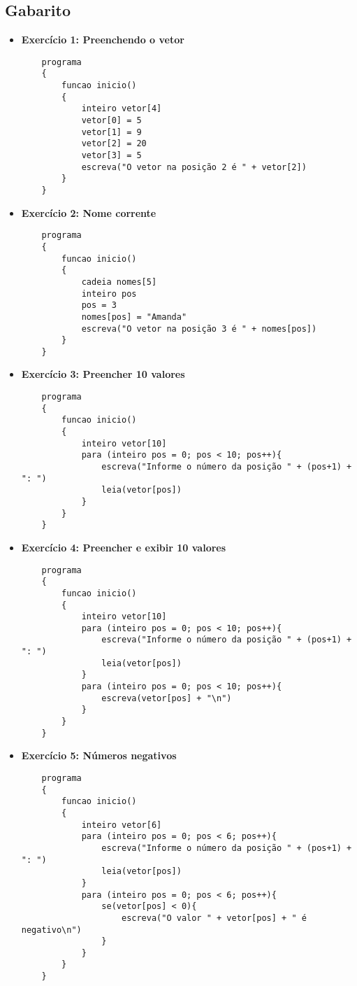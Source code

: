 \documentclass{article}
\begin{document}
\subsection*{Gabarito}
\begin{itemize}
    \item \textbf{Exercício 1: Preenchendo o vetor}
    \begin{lstlisting}
    programa
    {
        funcao inicio()
        {
            inteiro vetor[4]
            vetor[0] = 5
            vetor[1] = 9
            vetor[2] = 20
            vetor[3] = 5
            escreva("O vetor na posição 2 é " + vetor[2])
        }
    }
    \end{lstlisting}

    \item \textbf{Exercício 2: Nome corrente}
    \begin{lstlisting}
    programa
    {
        funcao inicio()
        {
            cadeia nomes[5]
            inteiro pos
            pos = 3
            nomes[pos] = "Amanda"
            escreva("O vetor na posição 3 é " + nomes[pos])
        }
    }
    \end{lstlisting}

    \item \textbf{Exercício 3: Preencher 10 valores}
    \begin{lstlisting}
    programa
    {
        funcao inicio()
        {
            inteiro vetor[10]
            para (inteiro pos = 0; pos < 10; pos++){
                escreva("Informe o número da posição " + (pos+1) + ": ")
                leia(vetor[pos])
            }
        }
    }
    \end{lstlisting}

    \item \textbf{Exercício 4: Preencher e exibir 10 valores}
    \begin{lstlisting}
    programa
    {
        funcao inicio()
        {
            inteiro vetor[10]
            para (inteiro pos = 0; pos < 10; pos++){
                escreva("Informe o número da posição " + (pos+1) + ": ")
                leia(vetor[pos])
            }
            para (inteiro pos = 0; pos < 10; pos++){
                escreva(vetor[pos] + "\n")
            }
        }
    }
    \end{lstlisting}

    \item \textbf{Exercício 5: Números negativos}
    \begin{lstlisting}
    programa
    {
        funcao inicio()
        {
            inteiro vetor[6]
            para (inteiro pos = 0; pos < 6; pos++){
                escreva("Informe o número da posição " + (pos+1) + ": ")
                leia(vetor[pos])
            }
            para (inteiro pos = 0; pos < 6; pos++){
                se(vetor[pos] < 0){
                    escreva("O valor " + vetor[pos] + " é negativo\n")
                }
            }
        }
    }
    \end{lstlisting}


\end{itemize}
\end{document}
